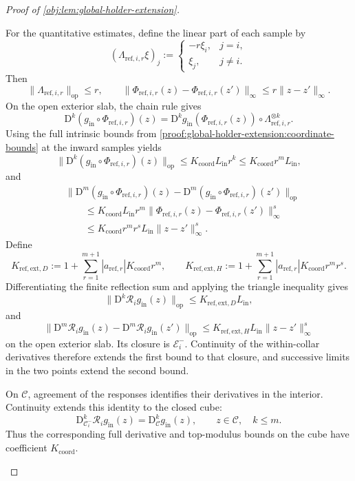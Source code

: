 \documentclass[11pt]{article}
\begin{document}
\begin{proof}[Proof of \cref{obj:lem:global-holder-extension}]
\begin{enumerate}
For the quantitative estimates, define the linear part of each sample by
\[
(\Lambda_{\mathrm{ref},i,r}\xi)_j
:=
\begin{cases}
-r\xi_i,&j=i,\\
\xi_j,&j\ne i.
\end{cases}
\]
Then
\[
\|\Lambda_{\mathrm{ref},i,r}\|_{\mathrm{op}}\le r,
\qquad
\|\Phi_{\mathrm{ref},i,r}(z)-\Phi_{\mathrm{ref},i,r}(z')\|_\infty
\le r\|z-z'\|_\infty.
\]
On the open exterior slab, the chain rule gives
\[
\mathrm D^k(g_{\mathrm{in}}\circ\Phi_{\mathrm{ref},i,r})(z)
=
\mathrm D^k g_{\mathrm{in}}(\Phi_{\mathrm{ref},i,r}(z))
\circ\Lambda_{\mathrm{ref},i,r}^{\otimes k}.
\]
Using the full intrinsic bounds from \cref{proof:global-holder-extension:coordinate-bounds} at the inward samples yields
\[
\|\mathrm D^k(g_{\mathrm{in}}\circ\Phi_{\mathrm{ref},i,r})(z)\|_{\mathrm{op}}
\le K_{\mathrm{coord}}L_{\mathrm{in}}r^k
\le K_{\mathrm{coord}}r^mL_{\mathrm{in}},
\]
and
\[
\begin{aligned}
&\|\mathrm D^m(g_{\mathrm{in}}\circ\Phi_{\mathrm{ref},i,r})(z)
-\mathrm D^m(g_{\mathrm{in}}\circ\Phi_{\mathrm{ref},i,r})(z')\|_{\mathrm{op}}\\
&\qquad\le
K_{\mathrm{coord}}L_{\mathrm{in}}r^m
\|\Phi_{\mathrm{ref},i,r}(z)-\Phi_{\mathrm{ref},i,r}(z')\|_\infty^s\\
&\qquad\le K_{\mathrm{coord}}r^mr^sL_{\mathrm{in}}\|z-z'\|_\infty^s.
\end{aligned}
\]
Define
\[
K_{\mathrm{ref},\mathrm{ext},D}
:=1+\sum_{r=1}^{m+1}|a_{\mathrm{ref},r}|K_{\mathrm{coord}}r^m,
\qquad
K_{\mathrm{ref},\mathrm{ext},H}
:=1+\sum_{r=1}^{m+1}|a_{\mathrm{ref},r}|K_{\mathrm{coord}}r^mr^s.
\]
Differentiating the finite reflection sum and applying the triangle inequality gives
\[
\|\mathrm D^k\mathscr R_i g_{\mathrm{in}}(z)\|_{\mathrm{op}}
\le K_{\mathrm{ref},\mathrm{ext},D}L_{\mathrm{in}},
\]
and
\[
\|\mathrm D^m\mathscr R_i g_{\mathrm{in}}(z)
-\mathrm D^m\mathscr R_i g_{\mathrm{in}}(z')\|_{\mathrm{op}}
\le K_{\mathrm{ref},\mathrm{ext},H}L_{\mathrm{in}}\|z-z'\|_\infty^s
\]
on the open exterior slab. Its closure is \(\mathcal E_i^-\). Continuity of the within-collar derivatives therefore extends the first bound to that closure, and successive limits in the two points extend the second bound.

On \(\mathcal C\), agreement of the responses identifies their derivatives in the interior. Continuity extends this identity to the closed cube:
\[
\mathrm D_{\mathcal C_i^-}^k\mathscr R_i g_{\mathrm{in}}(z)
=\mathrm D_{\mathcal C}^k g_{\mathrm{in}}(z),
\qquad z\in\mathcal C,\quad k\le m.
\]
Thus the corresponding full derivative and top-modulus bounds on the cube have coefficient \(K_{\mathrm{coord}}\).


\end{enumerate}
\end{proof}
\end{document}
